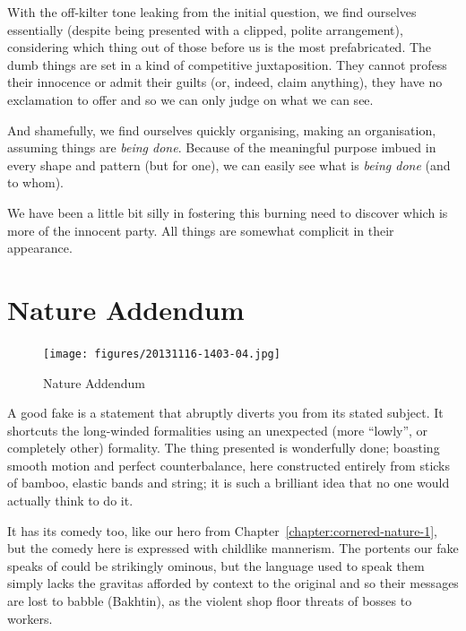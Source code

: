 \documentclass{book}
\begin{document}
With the off-kilter tone leaking from the initial question, we find ourselves
essentially (despite being presented with a clipped, polite arrangement),
considering which thing out of those before us is the most prefabricated. The
dumb things are set in a kind of competitive juxtaposition. They cannot profess
their innocence or admit their guilts (or, indeed, claim anything), they have
no exclamation to offer and so we can only judge on what we can see.

And shamefully, we find ourselves quickly organising, making an organisation,
assuming things are \emph{being done}. Because of the meaningful purpose imbued
in every shape and pattern (but for one), we can easily see what is \emph{being
done} (and to whom).

We have been a little bit silly in fostering this burning need to discover
which is more of the innocent party. All things are somewhat complicit in
their appearance.

\chapter{Nature Addendum}

\begin{figure}
\centering
\texttt{[image: figures/20131116-1403-04.jpg]}
\caption{Nature Addendum}
\end{figure}

A good fake is a statement that abruptly diverts you from its stated subject.
It shortcuts the long-winded formalities using an unexpected (more ``lowly'',
or completely other) formality. The thing presented is wonderfully done;
boasting smooth motion and perfect counterbalance, here constructed entirely
from sticks of bamboo, elastic bands and string; it is such a brilliant idea
that no one would actually think to do it.

It has its comedy too, like our hero from
Chapter~\ref{chapter:cornered-nature-1}, but the comedy here is expressed with
childlike mannerism. The portents our fake speaks of could be strikingly
ominous, but the language used to speak them simply lacks the gravitas afforded
by context to the original and so their messages are lost to babble (Bakhtin),
as the violent shop floor threats of bosses to workers.
\end{document}
